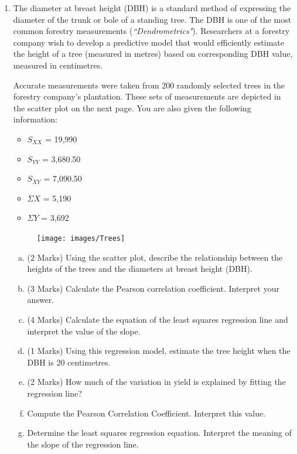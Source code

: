 \documentclass[a4paper,12pt]{article}
\begin{document}
\begin{enumerate}
\item The diameter at breast height (DBH) is a standard method of expressing the diameter of the trunk or bole of a standing tree. The DBH is one of the most common forestry measurements (\textit{``Dendrometrics"}). Researchers at a forestry company wish to develop a predictive model that would efficiently estimate the height of a tree (measured in metres) based on corresponding DBH value, measured in centimetres. 

Accurate measurements were taken from 200 randomly selected trees in the forestry company's plantation. These sets of measurements are depicted in the scatter plot on the next page. You are also given the following information: 
\begin{multicols}{3}
\begin{itemize}
\item $S_{XX}$ = 19,990
\item $S_{YY}$ = 3,680.50
\item $S_{XY}$ = 7,090.50
\item $\Sigma X$ = 5,190
\item $\Sigma Y$ = 3,692
\end{itemize}
\end{multicols}

 \begin{figure}[h!]
	\centering
	\texttt{[image: images/Trees]}
 \end{figure}
\smallskip
\begin{enumerate}[(a)]
	\item (2 Marks) Using the scatter plot, describe the relationship between the heights of the trees and the diameters at breast height (DBH).
	\item (3 Marks) Calculate the Pearson correlation coefficient. Interpret your answer.
	\item (4 Marks) Calculate the equation of the least squares regression line and interpret the value of the slope.
	\item (1 Marks) Using this regression model, estimate the tree height when the DBH is 20 centimetres. 
	\item (2 Marks) How much of the variation in yield is explained by fitting the regression line?
	
 \item Compute the Pearson Correlation Coefficient. Interpret this value.
 \item Determine the least squares regression equation. Interpret the meaning of the slope of the regression line.
\end{enumerate}


\end{enumerate}
\end{document}

